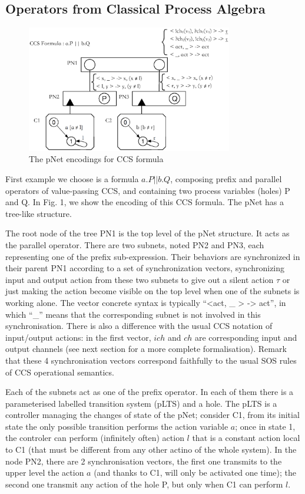\documentclass{lncs/llncs}
\begin{document}
\subsection{Operators from Classical Process Algebra}

\begin{figure}[h]
  \centerline{\includegraphics[width=9cm]{XFIG/CCS1}}
  \caption{The pNet encodings for CCS formula}  \label{schema:ccs-pnets}
\end{figure}

First example we choose is a formula $a.P||b.Q$, composing prefix and
parallel operators of value-passing CCS, and containing two process
variables (holes) P and Q. In Fig. 1, we show the encoding of this CCS
formula. The pNet has a tree-like structure.  

The root node of the tree PN1 is the top level of the pNet
  structure. It acts as the parallel operator. There are two subnets,
  noted PN2 and PN3, each representing one of the prefix
  sub-expression. Their behaviors are synchronized in their parent PN1
  according to a set of synchronization vectors, synchronizing input
  and output action from these two subnets to give out a silent action
  $\tau$ or just making the action become visible on the top level when
  one of the subnets is working alone. The vector concrete syntax is typically
  ``<act, \_ > -> act'', in which ``\_'' means that the corresponding
  subnet is not involved in this synchronisation.
  There is also a difference with the usual CCS notation of
  input/output actions: in the first vector, $ich$ and $ch$ are
  corresponding input and output channels (see next section for a more
  complete formalisation). 
  Remark that these 4
  synchronisation vectors correspond faithfully to the usual SOS
  rules of CCS operational semantics.

  Each of the subnets act as one of the prefix operator.
In each of them there is a parameterised labelled transition system
(pLTS) and a hole. The pLTS is a controller managing the
changes of state of the pNet; consider C1, from its initial state the
only possible transition performs the action variable $a$; once in
state 1, the controler can perform (infinitely often) action $l$ that
is a constant action local to C1 (that must be different from any
other actino of the whole system). In the node PN2, there are 2
synchronisation vectors, the first one transmits to the upper level the
action $a$ (and thanks to C1, will only be activated one time); the
second one transmit any action of the hole P, but only when C1 can
perform $l$.
\end{document}
